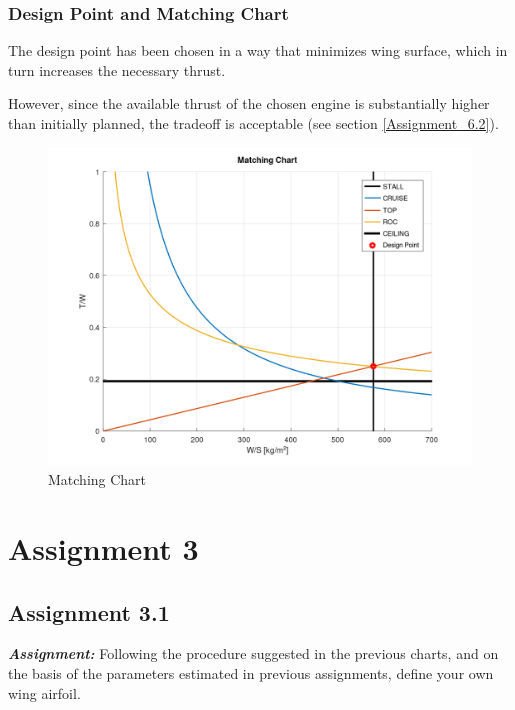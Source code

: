 \documentclass{article}
\begin{document}
\clearpage

\subsubsection{Design Point and Matching Chart\label{Matching_chart}}

The design point has been chosen in a way that minimizes wing surface, which in turn
increases the necessary thrust.

However, since the available thrust of the chosen engine is substantially higher than initially
planned, the tradeoff is acceptable (see section \ref{Assignment_6.2}).

\begin{figure}[h!]
    \centering
    \includegraphics[width=\textwidth]{Sources/Plots_and_Pictures/Matching_chart.png}
    \caption{Matching Chart}
    \label{matching_chart}
\end{figure}
\clearpage

\section{Assignment 3\label{Assignment_3}}

\subsection{Assignment 3.1\label{Assignment_3.1}}

\textbf{\textit{Assignment:}} Following the procedure suggested in the previous charts,
and on the basis of the parameters estimated in previous assignments,
define your own wing airfoil. \\ \\ \\ 
\end{document}
